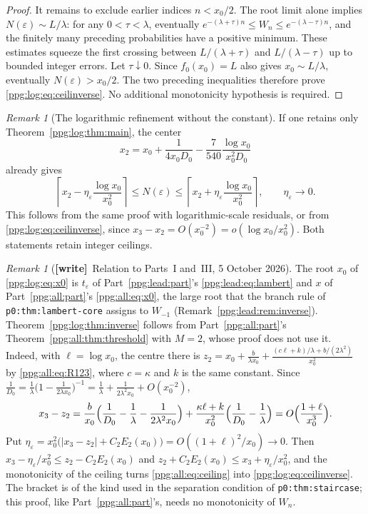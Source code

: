 \documentclass[11pt,letterpaper]{article}
\theoremstyle{remark}\newtheorem{remark}[theorem]{Remark}
\numberwithin{equation}{section}
\newcommand{\wtag}{\textup{\textbf{[write]}}}
\begin{document}
\begin{proof}
It remains to exclude earlier indices $n<x_0/2$. The root limit alone implies $N(\varepsilon)\sim L/\lambda$: for any $0<\tau<\lambda$, eventually
$e^{-(\lambda+\tau)n}\le W_n\le e^{-(\lambda-\tau)n}$, and the finitely many preceding probabilities have a positive minimum. These estimates squeeze the first crossing between $L/(\lambda+\tau)$ and $L/(\lambda-\tau)$ up to bounded integer errors. Let $\tau\downarrow0$. Since $f_0(x_0)=L$ also gives $x_0\sim L/\lambda$, eventually $N(\varepsilon)>x_0/2$. The two preceding inequalities therefore prove \eqref{ppg:log:eq:ceilinverse}. No additional monotonicity hypothesis is required.
\end{proof}

\begin{remark}[The logarithmic refinement without the constant]
If one retains only Theorem~\ref{ppg:log:thm:main}, the center
\begin{equation}\label{ppg:log:eq:x2}
 x_2=x_0+\frac{1}{4x_0D_0}
              -\frac7{540}\frac{\log x_0}{x_0^2D_0}
\end{equation}
already gives
\[
 \left\lceil x_2-\eta_\varepsilon\frac{\log x_0}{x_0^2}\right\rceil
 \le N(\varepsilon)\le
 \left\lceil x_2+\eta_\varepsilon\frac{\log x_0}{x_0^2}\right\rceil,
 \qquad\eta_\varepsilon\to0.
\]
This follows from the same proof with logarithmic-scale residuals, or from \eqref{ppg:log:eq:ceilinverse}, since $x_3-x_2=O(x_0^{-2})=o(\log x_0/x_0^2)$. Both statements retain integer ceilings.
\end{remark}

\begin{remark}[\wtag\ Relation to Parts~I and~III, 5 October 2026]\label{ppg:log:rem:inverse}
The root $x_0$ of \eqref{ppg:log:eq:x0} is $t_\varepsilon$ of Part~\ref{ppg:lead:part}'s \eqref{ppg:lead:eq:lambert} and $x$ of Part~\ref{ppg:all:part}'s \eqref{ppg:all:eq:x0}, the large root that the branch rule of \texttt{p0:thm:lambert-core} \cite{tsvol} assigns to $W_{-1}$ (Remark~\ref{ppg:lead:rem:inverse}). Theorem~\ref{ppg:log:thm:inverse} follows from Part~\ref{ppg:all:part}'s Theorem~\ref{ppg:all:thm:threshold} with $M=2$, whose proof does not use it. Indeed, with $\ell=\log x_0$, the centre there is $z_2=x_0+\frac b{\lambda x_0}+\frac{(c\ell+k)/\lambda+b/(2\lambda^2)}{x_0^2}$ by \eqref{ppg:all:eq:R123}, where $c=\kappa$ and $k$ is the same constant. Since $\frac1{D_0}=\frac1\lambda\bigl(1-\frac1{2\lambda x_0}\bigr)^{-1}=\frac1\lambda+\frac1{2\lambda^2x_0}+O(x_0^{-2})$,
\[
 x_3-z_2=\frac b{x_0}\Bigl(\frac1{D_0}-\frac1\lambda-\frac1{2\lambda^2x_0}\Bigr)
  +\frac{\kappa\ell+k}{x_0^2}\Bigl(\frac1{D_0}-\frac1\lambda\Bigr)
  =O\Bigl(\frac{1+\ell}{x_0^3}\Bigr).
\]
Put $\eta_\varepsilon=x_0^2\bigl(|x_3-z_2|+C_2E_2(x_0)\bigr)=O((1+\ell)^2/x_0)\to0$. Then $x_3-\eta_\varepsilon/x_0^2\le z_2-C_2E_2(x_0)$ and $z_2+C_2E_2(x_0)\le x_3+\eta_\varepsilon/x_0^2$, and the monotonicity of the ceiling turns \eqref{ppg:all:eq:ceiling} into \eqref{ppg:log:eq:ceilinverse}. The bracket is of the kind used in the separation condition of \texttt{p0:thm:staircase}; this proof, like Part~\ref{ppg:all:part}'s, needs no monotonicity of $W_n$.
\end{remark}
\end{document}
